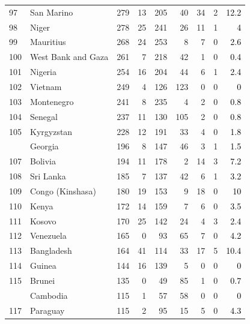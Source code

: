 \documentclass[12pt, a4paper,oneside]{book}
\theoremstyle{definition}
\begin{document}
\begin{longtable}{llrrrrrrr}
	\rowcolor{gray!6}  97 & San Marino & 279 & 13 & 205 & 40 & 34 & 2 & \textcolor{black}{12.2}\\
	98 & Niger & 278 & 25 & 241 & 26 & 11 & 1 & \textcolor{black}{4}\\
	\rowcolor{gray!6}  99 & Mauritius & 268 & 24 & 253 & 8 & 7 & 0 & \textcolor{black}{2.6}\\
	100 & West Bank and Gaza & 261 & 7 & 218 & 42 & 1 & 0 & \textcolor{black}{0.4}\\
	\addlinespace
	\rowcolor{gray!6}  101 & Nigeria & 254 & 16 & 204 & 44 & 6 & 1 & \textcolor{black}{2.4}\\
	102 & Vietnam & 249 & 4 & 126 & 123 & 0 & 0 & \textcolor{black}{0}\\
	\rowcolor{gray!6}  103 & Montenegro & 241 & 8 & 235 & 4 & 2 & 0 & \textcolor{black}{0.8}\\
	104 & Senegal & 237 & 11 & 130 & 105 & 2 & 0 & \textcolor{black}{0.8}\\
	\rowcolor{gray!6}  105 & Kyrgyzstan & 228 & 12 & 191 & 33 & 4 & 0 & \textcolor{black}{1.8}\\
	\addlinespace
	106 & Georgia & 196 & 8 & 147 & 46 & 3 & 1 & \textcolor{black}{1.5}\\
	\rowcolor{gray!6}  107 & Bolivia & 194 & 11 & 178 & 2 & 14 & 3 & \textcolor{black}{7.2}\\
	108 & Sri Lanka & 185 & 7 & 137 & 42 & 6 & 1 & \textcolor{black}{3.2}\\
	\rowcolor{gray!6}  109 & Congo (Kinshasa) & 180 & 19 & 153 & 9 & 18 & 0 & \textcolor{black}{10}\\
	110 & Kenya & 172 & 14 & 159 & 7 & 6 & 0 & \textcolor{black}{3.5}\\
	\addlinespace
	\rowcolor{gray!6}  111 & Kosovo & 170 & 25 & 142 & 24 & 4 & 3 & \textcolor{black}{2.4}\\
	112 & Venezuela & 165 & 0 & 93 & 65 & 7 & 0 & \textcolor{black}{4.2}\\
	\rowcolor{gray!6}  113 & Bangladesh & 164 & 41 & 114 & 33 & 17 & 5 & \textcolor{black}{10.4}\\
	114 & Guinea & 144 & 16 & 139 & 5 & 0 & 0 & \textcolor{black}{0}\\
	\rowcolor{gray!6}  115 & Brunei & 135 & 0 & 49 & 85 & 1 & 0 & \textcolor{black}{0.7}\\
	\addlinespace
	116 & Cambodia & 115 & 1 & 57 & 58 & 0 & 0 & \textcolor{black}{0}\\
	\rowcolor{gray!6}  117 & Paraguay & 115 & 2 & 95 & 15 & 5 & 0 & \textcolor{black}{4.3}\\

\end{longtable}
\end{document}
